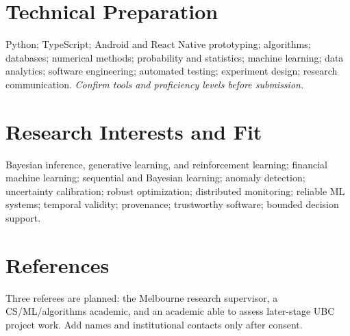 \documentclass[11pt]{article}
\begin{document}
\section*{Technical Preparation}
Python; TypeScript; Android and React Native prototyping; algorithms; databases; numerical methods; probability and statistics; machine learning; data analytics; software engineering; automated testing; experiment design; research communication. \textit{Confirm tools and proficiency levels before submission.}

\section*{Research Interests and Fit}
Bayesian inference, generative learning, and reinforcement learning; financial machine learning; sequential and Bayesian learning; anomaly detection; uncertainty calibration; robust optimization; distributed monitoring; reliable ML systems; temporal validity; provenance; trustworthy software; bounded decision support.

\section*{References}
Three referees are planned: the Melbourne research supervisor, a CS/ML/algorithms academic, and an academic able to assess later-stage UBC project work. Add names and institutional contacts only after consent.
\end{document}
